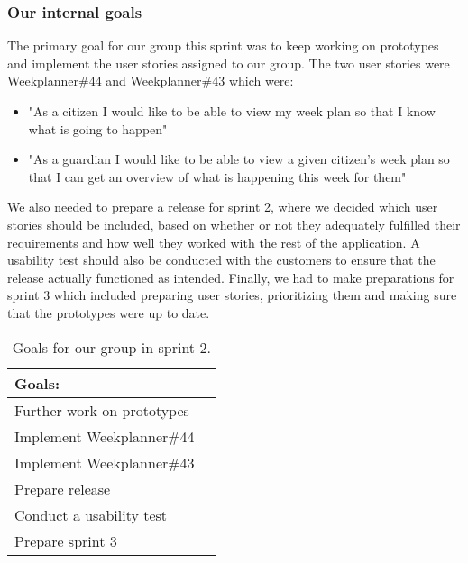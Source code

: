 \subsubsection{Our internal goals}
The primary goal for our group this sprint was to keep working on prototypes and implement the user stories assigned to our group.
The two user stories were Weekplanner\#44 and Weekplanner\#43 which were:
\begin{itemize}
 \item "As a citizen I would like to be able to view my week plan so that I know what is going to happen" 
 \item "As a guardian I would like to be able to view a given citizen's week plan so that I can get an overview of what is happening this week for them"
\end{itemize}
We also needed to prepare a release for sprint 2, where we decided which user stories should be included, based on whether or not they adequately fulfilled their requirements and how well they worked with the rest of the application.
A usability test should also be conducted with the customers to ensure that the release actually functioned as intended.
Finally, we had to make preparations for sprint 3 which included preparing user stories, prioritizing them and making sure that the prototypes were up to date.
\begin{table}[H]
    \centering
    \begin{tabular}{|l|l|}
    \hline
    Goals:                                   \\ \hline
    Further work on prototypes              \\ \hline
    Implement Weekplanner\#44               \\ \hline
    Implement Weekplanner\#43               \\ \hline
    Prepare release                          \\ \hline
    Conduct a usability test                   \\ \hline
    Prepare sprint 3                         \\ \hline
    \end{tabular}
    \caption{Goals for our group in sprint 2.}
    \label{PO-goal-sprint-2}
\end{table}
